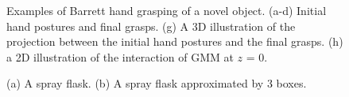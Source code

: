 \begin{figure}[!ht]
\caption{  {Examples of Barrett hand grasping of a novel object. (a-d) Initial hand postures and final grasps. (g) A 3D illustration of the projection between the initial hand postures and the final grasps. (h) a 2D illustration of the interaction of GMM at $z$ = 0.}}

\label{fig_result}
\end{figure}

\begin{figure}
\centering
    \hspace{1cm}
\caption{  {(a) A spray flask. (b) A spray flask approximated by 3 boxes.}}
\label{fig:spr}
\end{figure}



